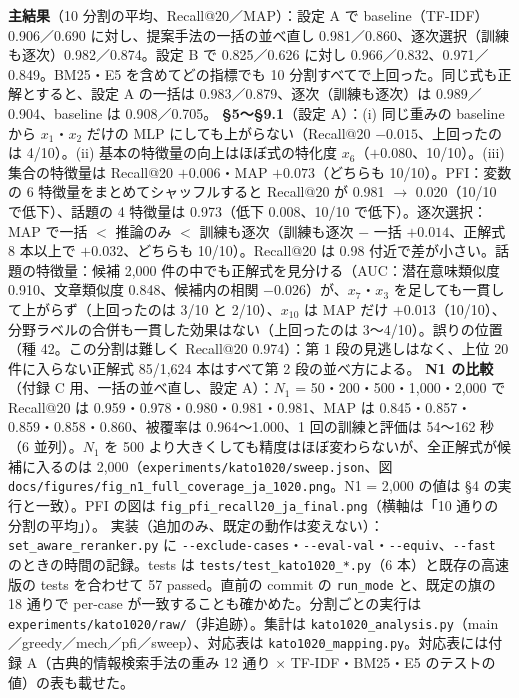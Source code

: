\documentclass[11pt,a4paper]{jsarticle}
\begin{document}
\begin{itemize}[nosep]
    \textbf{主結果}（10 分割の平均、Recall@20／MAP）：設定 A で baseline（TF-IDF）0.906／0.690 に対し、提案手法の一括の並べ直し 0.981／0.860、逐次選択（訓練も逐次）0.982／0.874。設定 B で 0.825／0.626 に対し 0.966／0.832、0.971／0.849。BM25・E5 を含めてどの指標でも 10 分割すべてで上回った。同じ式も正解とすると、設定 A の一括は 0.983／0.879、逐次（訓練も逐次）は 0.989／0.904、baseline は 0.908／0.705。
    \textbf{\S 5〜\S 9.1}（設定 A）：(i) 同じ重みの baseline から $x_1$・$x_2$ だけの MLP にしても上がらない（Recall@20 $-0.015$、上回ったのは 4/10）。(ii) 基本の特徴量の向上はほぼ式の特化度 $x_6$（$+0.080$、10/10）。(iii) 集合の特徴量は Recall@20 $+0.006$・MAP $+0.073$（どちらも 10/10）。PFI：変数の 6 特徴量をまとめてシャッフルすると Recall@20 が 0.981 $\to$ 0.020（10/10 で低下）、話題の 4 特徴量は 0.973（低下 0.008、10/10 で低下）。逐次選択：MAP で一括 $<$ 推論のみ $<$ 訓練も逐次（訓練も逐次 $-$ 一括 $+0.014$、正解式 8 本以上で $+0.032$、どちらも 10/10）。Recall@20 は 0.98 付近で差が小さい。話題の特徴量：候補 2{,}000 件の中でも正解式を見分ける（AUC：潜在意味類似度 0.910、文章類似度 0.848、候補内の相関 $-0.026$）が、$x_7$・$x_3$ を足しても一貫して上がらず（上回ったのは 3/10 と 2/10）、$x_{10}$ は MAP だけ $+0.013$（10/10）、分野ラベルの合併も一貫した効果はない（上回ったのは 3〜4/10）。誤りの位置（種 42。この分割は難しく Recall@20 0.974）：第 1 段の見逃しはなく、上位 20 件に入らない正解式 85/1{,}624 本はすべて第 2 段の並べ方による。
    \textbf{N1 の比較}（付録 C 用、一括の並べ直し、設定 A）：$N_1$ = 50・200・500・1{,}000・2{,}000 で Recall@20 は 0.959・0.978・0.980・0.981・0.981、MAP は 0.845・0.857・0.859・0.858・0.860、被覆率は 0.964〜1.000、1 回の訓練と評価は 54〜162 秒（6 並列）。$N_1$ を 500 より大きくしても精度はほぼ変わらないが、全正解式が候補に入るのは 2{,}000（\texttt{experiments/kato1020/sweep.json}、図 \texttt{docs/figures/fig\_n1\_full\_coverage\_ja\_1020.png}。N1 = 2{,}000 の値は \S 4 の実行と一致）。PFI の図は \texttt{fig\_pfi\_recall20\_ja\_final.png}（横軸は「10 通りの分割の平均」）。
    実装（追加のみ、既定の動作は変えない）：\texttt{set\_aware\_reranker.py} に \texttt{-{}-exclude-cases}・\texttt{-{}-eval-val}・\texttt{-{}-equiv}、\texttt{-{}-fast} のときの時間の記録。tests は \texttt{tests/test\_kato1020\_*.py}（6 本）と既存の高速版の tests を合わせて 57 passed。直前の commit の \texttt{run\_mode} と、既定の旗の 18 通りで per-case が一致することも確かめた。分割ごとの実行は \texttt{experiments/kato1020/raw/}（非追跡）。集計は \texttt{kato1020\_analysis.py}（main／greedy／mech／pfi／sweep）、対応表は \texttt{kato1020\_mapping.py}。対応表には付録 A（古典的情報検索手法の重み 12 通り × TF-IDF・BM25・E5 のテストの値）の表も載せた。

\end{itemize}
\end{document}
